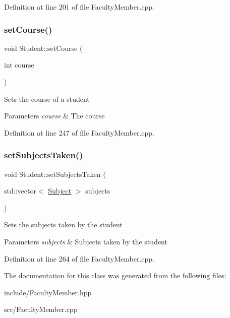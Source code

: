 Definition at line 201 of file Faculty\+Member.\+cpp.

\mbox{\label{classStudent_af7affdfd5b1b9e4d8c8d1fcb1e2cc631}} 
\subsubsection{\texorpdfstring{set\+Course()}{setCourse()}}
{\footnotesize\ttfamily void Student\+::set\+Course (\begin{DoxyParamCaption}\item[{int}]{course }\end{DoxyParamCaption})}

Sets the course of a student 
\begin{DoxyParams}{Parameters}
{\em course} & The course \\
\hline
\end{DoxyParams}


Definition at line 247 of file Faculty\+Member.\+cpp.

\mbox{\label{classStudent_a2a24ebdce323c9cea4060b1cd9d343c9}} 
\subsubsection{\texorpdfstring{set\+Subjects\+Taken()}{setSubjectsTaken()}}
{\footnotesize\ttfamily void Student\+::set\+Subjects\+Taken (\begin{DoxyParamCaption}\item[{std\+::vector$<$ \hyperlink{classSubject}{Subject} $>$}]{subjects }\end{DoxyParamCaption})}

Sets the subjects taken by the student 
\begin{DoxyParams}{Parameters}
{\em subjects} & Subjects taken by the student \\
\hline
\end{DoxyParams}


Definition at line 264 of file Faculty\+Member.\+cpp.



The documentation for this class was generated from the following files\+:\begin{DoxyCompactItemize}
\item 
include/Faculty\+Member.\+hpp\item 
src/Faculty\+Member.\+cpp\end{DoxyCompactItemize}
